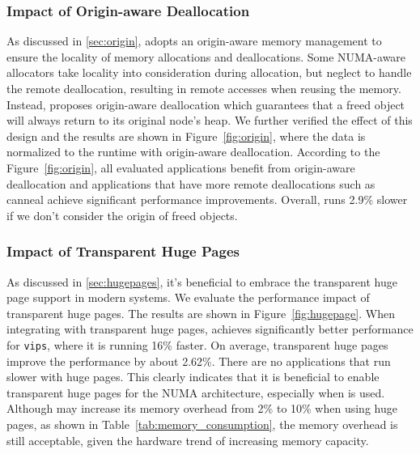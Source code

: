 
\subsubsection{Impact of Origin-aware Deallocation}

As discussed in \ref{sec:origin}, \NM{} adopts an origin-aware memory management to ensure the locality of memory allocations and deallocations. Some NUMA-aware allocators take locality into consideration during allocation, but neglect to handle the remote deallocation, resulting in remote accesses when reusing the memory. Instead, \NM{} proposes origin-aware deallocation which guarantees that a freed object will always return to its original node's heap. We further verified the effect of this design and the results are shown in Figure~\ref{fig:origin}, where the data is normalized to the runtime with origin-aware deallocation. According to the Figure~\ref{fig:origin}, all evaluated applications benefit from origin-aware deallocation and applications that have more remote deallocations such as canneal achieve significant performance improvements. Overall, \NM{} runs 2.9\% slower if we don't consider the origin of freed objects.


\subsubsection{Impact of Transparent Huge Pages}

As discussed in \ref{sec:hugepages}, it's beneficial to embrace the transparent huge page support in modern systems. We evaluate the performance impact of transparent huge pages. The results are shown in Figure~\ref{fig:hugepage}. When integrating with transparent huge pages, \NM{} achieves significantly better performance for \texttt{vips}, where it is running 16\% faster. On average, transparent huge pages improve the performance by about 2.62\%. There are no applications that run slower with huge pages. This clearly indicates that it is beneficial to enable transparent huge pages for the NUMA architecture, especially when \NM{} is used. 
Although \NM{} may increase its memory overhead from 2\% to 10\% when using huge pages, as shown in Table~\ref{tab:memory_consumption}, the memory overhead is still acceptable, given the hardware trend of increasing memory capacity.  


